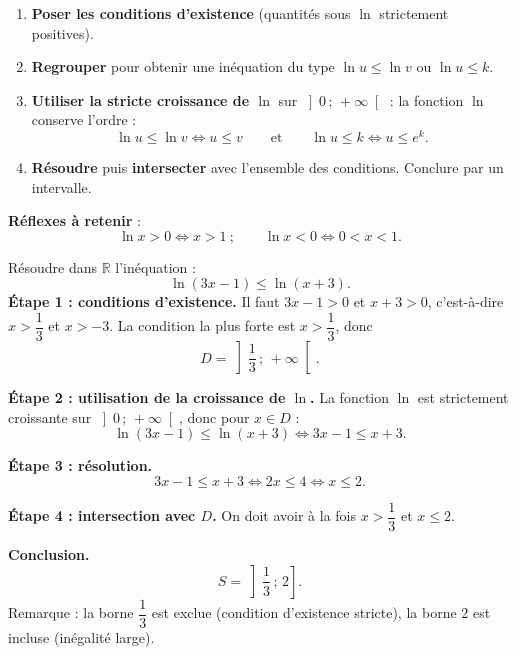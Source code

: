 \documentclass[11pt]{article}
\newcommand{\cle}[1]{{\popxbold\color{popdark}#1}}
\begin{document}
\begin{methode}
\begin{enumerate}
\item \textbf{Poser les conditions d'existence} (quantités sous $\ln$ strictement positives).
\item \textbf{Regrouper} pour obtenir une inéquation du type $\ln u \leqslant \ln v$ ou $\ln u \leqslant k$.
\item \textbf{Utiliser la stricte croissance de $\ln$} sur $\left]0\,;\,+\infty\right[$ : la fonction $\ln$ \cle{conserve l'ordre} :
\[ \ln u \leqslant \ln v \iff u \leqslant v \qquad \text{et} \qquad \ln u \leqslant k \iff u \leqslant e^{k}. \]
\item \textbf{Résoudre} puis \textbf{intersecter} avec l'ensemble des conditions. Conclure par un intervalle.
\end{enumerate}
\textbf{Réflexes à retenir} :
\[ \ln x > 0 \iff x > 1 \ ; \qquad \ln x < 0 \iff 0 < x < 1. \]
\end{methode}

\begin{exoresolu}
Résoudre dans $\mathbb{R}$ l'inéquation :
\[ \ln(3x - 1) \leqslant \ln(x + 3). \]
\tcblower
\textbf{Étape 1 : conditions d'existence.}
Il faut $3x - 1 > 0$ et $x + 3 > 0$, c'est-à-dire $x > \dfrac{1}{3}$ et $x > -3$. La condition la plus forte est $x > \dfrac{1}{3}$, donc
\[ D = \left]\frac{1}{3}\,;\,+\infty\right[. \]

\textbf{Étape 2 : utilisation de la croissance de $\ln$.}
La fonction $\ln$ est strictement croissante sur $\left]0\,;\,+\infty\right[$, donc pour $x \in D$ :
\[ \ln(3x-1) \leqslant \ln(x+3) \iff 3x - 1 \leqslant x + 3. \]

\textbf{Étape 3 : résolution.}
\[ 3x - 1 \leqslant x + 3 \iff 2x \leqslant 4 \iff x \leqslant 2. \]

\textbf{Étape 4 : intersection avec $D$.}
On doit avoir à la fois $x > \dfrac{1}{3}$ et $x \leqslant 2$.

\textbf{Conclusion.}
\[ \boxed{S = \left]\frac{1}{3}\,;\,2\right]}. \]
Remarque : la borne $\dfrac{1}{3}$ est exclue (condition d'existence stricte), la borne $2$ est incluse (inégalité large).
\end{exoresolu}
\end{document}

